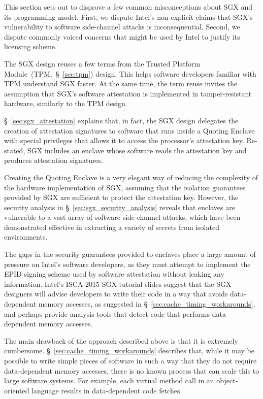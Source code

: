 \label{sec:sgx_misconceptions}

This section sets out to disprove a few common misconceptions about SGX and its
programming model. First, we dispute Intel's non-explicit claims that SGX's
vulnerability to software side-channel attacks is inconsequential. Second, we
dispute commonly voiced concerns that might be used by Intel to justify its
licensing scheme.



The SGX design reuses a few terms from the Trusted Platform
Module~(TPM,~\S~\ref{sec:tpm}) design. This helps software developers familiar
with TPM understand SGX faster. At the same time, the term reuse invites the
assumption that SGX's software attestation is implemented in tamper-resistant
hardware, similarly to the TPM design.

\S~\ref{sec:sgx_attestation} explains that, in fact, the SGX design delegates
the creation of attestation signatures to software that runs inside a
Quoting Enclave with special privileges that allows it to access the
processor's attestation key. Re-stated, SGX includes an enclave whose
software reads the attestation key and produces attestation signatures.

Creating the Quoting Enclave is a very elegant way of reducing the complexity
of the hardware implementation of SGX, assuming that the isolation guarantees
provided by SGX are sufficient to protect the attestation key. However, the
security analysis in \S~\ref{sec:sgx_security_analysis} reveals that enclaves
are vulnerable to a vast array of software side-channel attacks, which have
been demonstrated effective in extracting a variety of secrets from isolated
environments.


The gaps in the security guarantees provided to enclaves place a large amount
of pressure on Intel's software developers, as they must attempt to implement
the EPID signing scheme used by software attestation without leaking any
information. Intel's ISCA 2015 SGX tutorial slides suggest that the SGX
designers will advise developers to write their code in a way that avoids
data-dependent memory accesses, as suggested in
\S~\ref{sec:cache_timing_workarounds}, and perhaps provide analysis tools that
detect code that performs data-dependent memory accesses.

The main drawback of the approach described above is that it is extremely
cumbersome. \S~\ref{sec:cache_timing_workarounds} describes that, while it may
be possible to write simple pieces of software in such a way that they do not
require data-dependent memory accesses, there is no known process that can
scale this to large software systems. For example, each virtual method call in
an object-oriented language results in data-dependent code fetches.

